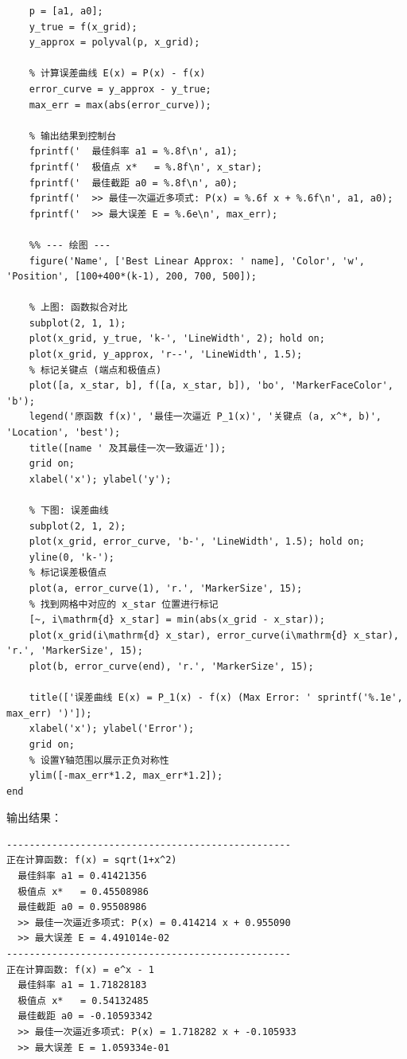 \documentclass[UTF8, a4paper, 11pt]{ctexart}
\begin{document}
\begin{lstlisting}[caption={两个凸函数的最佳一致逼近计算与拟合效果}]
    % 构造逼近多项式 P(x) = a1*x + a0
    p = [a1, a0]; 
    y_true = f(x_grid);
    y_approx = polyval(p, x_grid);
    
    % 计算误差曲线 E(x) = P(x) - f(x)
    error_curve = y_approx - y_true;
    max_err = max(abs(error_curve));
    
    % 输出结果到控制台
    fprintf('  最佳斜率 a1 = %.8f\n', a1);
    fprintf('  极值点 x*   = %.8f\n', x_star);
    fprintf('  最佳截距 a0 = %.8f\n', a0);
    fprintf('  >> 最佳一次逼近多项式: P(x) = %.6f x + %.6f\n', a1, a0);
    fprintf('  >> 最大误差 E = %.6e\n', max_err);
    
    %% --- 绘图 ---
    figure('Name', ['Best Linear Approx: ' name], 'Color', 'w', 'Position', [100+400*(k-1), 200, 700, 500]);
    
    % 上图: 函数拟合对比
    subplot(2, 1, 1);
    plot(x_grid, y_true, 'k-', 'LineWidth', 2); hold on;
    plot(x_grid, y_approx, 'r--', 'LineWidth', 1.5);
    % 标记关键点 (端点和极值点)
    plot([a, x_star, b], f([a, x_star, b]), 'bo', 'MarkerFaceColor', 'b');
    legend('原函数 f(x)', '最佳一次逼近 P_1(x)', '关键点 (a, x^*, b)', 'Location', 'best');
    title([name ' 及其最佳一次一致逼近']);
    grid on;
    xlabel('x'); ylabel('y');
    
    % 下图: 误差曲线
    subplot(2, 1, 2);
    plot(x_grid, error_curve, 'b-', 'LineWidth', 1.5); hold on;
    yline(0, 'k-');
    % 标记误差极值点
    plot(a, error_curve(1), 'r.', 'MarkerSize', 15);
    % 找到网格中对应的 x_star 位置进行标记
    [~, i\mathrm{d} x_star] = min(abs(x_grid - x_star));
    plot(x_grid(i\mathrm{d} x_star), error_curve(i\mathrm{d} x_star), 'r.', 'MarkerSize', 15);
    plot(b, error_curve(end), 'r.', 'MarkerSize', 15);
    
    title(['误差曲线 E(x) = P_1(x) - f(x) (Max Error: ' sprintf('%.1e', max_err) ')']);
    xlabel('x'); ylabel('Error');
    grid on;
    % 设置Y轴范围以展示正负对称性
    ylim([-max_err*1.2, max_err*1.2]);
end
\end{lstlisting}

输出结果：
\begin{lstlisting}
--------------------------------------------------
正在计算函数: f(x) = sqrt(1+x^2)
  最佳斜率 a1 = 0.41421356
  极值点 x*   = 0.45508986
  最佳截距 a0 = 0.95508986
  >> 最佳一次逼近多项式: P(x) = 0.414214 x + 0.955090
  >> 最大误差 E = 4.491014e-02
--------------------------------------------------
正在计算函数: f(x) = e^x - 1
  最佳斜率 a1 = 1.71828183
  极值点 x*   = 0.54132485
  最佳截距 a0 = -0.10593342
  >> 最佳一次逼近多项式: P(x) = 1.718282 x + -0.105933
  >> 最大误差 E = 1.059334e-01    
\end{lstlisting}
\end{document}
